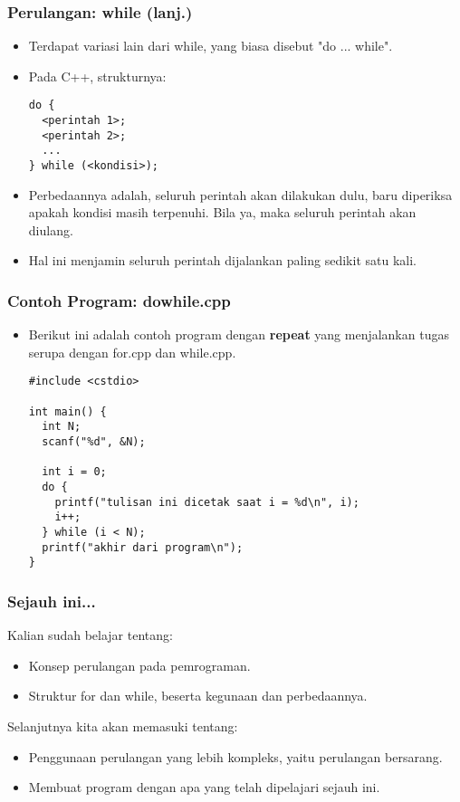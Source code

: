 \begin{frame}[fragile]
\frametitle{Perulangan: while (lanj.)}
\begin{itemize}
  \item Terdapat variasi lain dari while, yang biasa disebut "do ... while".
  \item Pada C++, strukturnya:
\begin{lstlisting}
do {
  <perintah 1>;
  <perintah 2>;
  ...
} while (<kondisi>);
\end{lstlisting}
  \item Perbedaannya adalah, seluruh perintah akan dilakukan dulu, baru diperiksa apakah kondisi masih terpenuhi. Bila ya, maka seluruh perintah akan diulang.
  \item Hal ini menjamin seluruh perintah dijalankan paling sedikit satu kali.  
\end{itemize}
\end{frame}

\begin{frame}[fragile]
\frametitle{Contoh Program: dowhile.cpp}
\begin{itemize}
  \item Berikut ini adalah contoh program dengan \textbf{repeat} yang menjalankan tugas serupa dengan for.cpp dan while.cpp.
\begin{lstlisting}
#include <cstdio>

int main() {
  int N;
  scanf("%d", &N);

  int i = 0;
  do {
    printf("tulisan ini dicetak saat i = %d\n", i);
    i++;
  } while (i < N);
  printf("akhir dari program\n");
}
\end{lstlisting}
\end{itemize}
\end{frame}

\begin{frame}
\frametitle{Sejauh ini...}
Kalian sudah belajar tentang:
\begin{itemize}
  \item Konsep perulangan pada pemrograman.
  \item Struktur for dan while, beserta kegunaan dan perbedaannya.
\end{itemize}
Selanjutnya kita akan memasuki tentang:
\begin{itemize}
  \item Penggunaan perulangan yang lebih kompleks, yaitu perulangan bersarang.
  \item Membuat program dengan apa yang telah dipelajari sejauh ini.
\end{itemize}
\end{frame}


